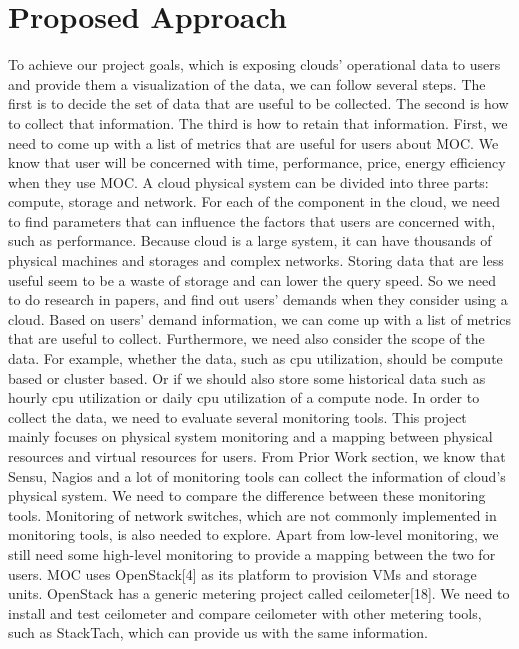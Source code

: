 \section{Proposed Approach}
\label{sec:ProposedApproach}
To achieve our project goals, which is exposing clouds’ operational data to users and provide them a visualization of the data, we can follow several steps. The first is to decide the set of data that are useful to be collected. The second is how to collect that information. The third is how to retain that information. 
  First, we need to come up with a list of metrics that are useful for users about MOC. We know that user will be concerned with time, performance, price, energy efficiency when they use MOC.  A cloud physical system can be divided into three parts: compute, storage and network. For each of the component in the cloud, we need to find parameters that can influence the factors that users are concerned with, such as performance. Because cloud is a large system, it can have thousands of physical machines and storages and complex networks. Storing data that are less useful seem to be a waste of storage and can lower the query speed. So we need to do research in papers, and find out users’ demands when they consider using a cloud. Based on users’ demand information, we can come up with a list of metrics that are useful to collect. Furthermore, we need also consider the scope of the data. For example, whether the data, such as cpu utilization, should be compute based or cluster based. Or if we should also store some historical data such as hourly cpu utilization or daily cpu utilization of a compute node. 
  In order to collect the data, we need to evaluate several monitoring tools. This project mainly focuses on physical system monitoring and a mapping between physical resources and virtual resources for users. From Prior Work section, we know that Sensu, Nagios and a lot of monitoring tools can collect the information of cloud’s physical system. We need to compare the difference between these monitoring tools. Monitoring of network switches, which are not commonly implemented in monitoring tools, is also needed to explore. 
  Apart from low-level monitoring, we still need some high-level monitoring to provide a mapping between the two for users. MOC uses OpenStack[4] as its platform to provision VMs and storage units. OpenStack has a generic metering project called ceilometer[18]. We need to install and test ceilometer and compare ceilometer with other metering tools, such as StackTach, which can provide us with the same information. 
